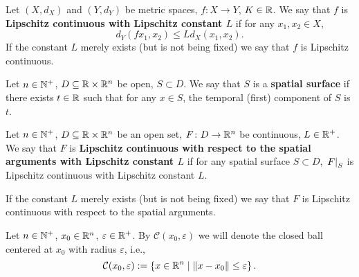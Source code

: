 \begin{definition}
  Let
    $(X, d_X)$ and $(Y, d_Y)$ be metric spaces,
    $f \colon X \to Y$,
    $K \in \mathbb{R}$.
  We say that $f$ is \textbf{Lipschitz continuous with Lipschitz constant $L$}
  if for any $x_1, x_2 \in X$,
  \begin{equation}
    d_Y(f x_1, x_2) \leq L d_X(x_1, x_2).
  \end{equation}
  If the constant $L$ merely exists (but is not being fixed) we say that
  $f$ is Lipschitz continuous.
\end{definition}
\begin{definition}
  Let $n \in \mathbb{N}^+$, $D \subseteq \mathbb{R} \times \mathbb{R}^n$ be open, $S \subset D$.
  We say that $S$ is a \textbf{spatial surface} if there exists $t \in \mathbb{R}$ such
  that for any $x \in S$, the temporal (first) component of $S$ is $t$.
\end{definition}
\begin{definition}
  Let
    $n \in \mathbb{N}^+$,
    $D \subseteq \mathbb{R} \times \mathbb{R}^n$ be an open set,
    $F \colon D \to \mathbb{R}^n$ be continuous,
    $L \in \mathbb{R}^+$.
  We say that $F$ is \textbf{Lipschitz continuous with respect to the spatial
  arguments with Lipschitz constant $L$} if for any spatial surface
  $S \subset D$, $\left. F \right|_{S}$ is Lipschitz continuous with Lipschitz
  constant $L$.

  If the constant $L$ merely exists (but is not being fixed) we say that
  $F$ is Lipschitz continuous with respect to the spatial arguments.
\end{definition}
\begin{notation}
  Let $n \in \mathbb{N}^+$, $x_0 \in \mathbb{R}^n$, $\varepsilon \in \mathbb{R}^+$.
  By $\mathcal{C}(x_0, \varepsilon)$ we will denote the closed ball centered at
  $x_0$ with
  radius $\varepsilon$, i.e.,
  \begin{equation}
    \mathcal{C}(x_0, \varepsilon)
    := \left\{ x \in \mathbb{R}^n \mid \left\lVert x - x_0\right\rVert \leq \varepsilon \right\}.
  \end{equation}
\end{notation}
